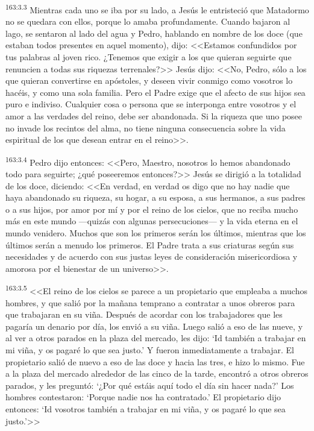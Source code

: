 \par 
\textsuperscript{163:3.3} Mientras cada uno se iba por su lado, a Jesús le entristeció que Matadormo no se quedara con ellos, porque lo amaba profundamente. Cuando bajaron al lago, se sentaron al lado del agua y Pedro, hablando en nombre de los doce (que estaban todos presentes en aquel momento), dijo: <<Estamos confundidos por tus palabras al joven rico. ¿Tenemos que exigir a los que quieran seguirte que renuncien a todas sus riquezas terrenales?>> Jesús dijo: <<No, Pedro, sólo a los que quieran convertirse en apóstoles, y deseen vivir conmigo como vosotros lo hacéis, y como una sola familia. Pero el Padre exige que el afecto de sus hijos sea puro e indiviso. Cualquier cosa o persona que se interponga entre vosotros y el amor a las verdades del reino, debe ser abandonada. Si la riqueza que uno posee no invade los recintos del alma, no tiene ninguna consecuencia sobre la vida espiritual de los que desean entrar en el reino>>.

\par 
\textsuperscript{163:3.4} Pedro dijo entonces: <<Pero, Maestro, nosotros lo hemos abandonado todo para seguirte; ¿qué poseeremos entonces?>> Jesús se dirigió a la totalidad de los doce, diciendo: <<En verdad, en verdad os digo que no hay nadie que haya abandonado su riqueza, su hogar, a su esposa, a sus hermanos, a sus padres o a sus hijos, por amor por mí y por el reino de los cielos, que no reciba mucho más en este mundo ---quizás con algunas persecuciones--- y la vida eterna en el mundo venidero. Muchos que son los primeros serán los últimos, mientras que los últimos serán a menudo los primeros. El Padre trata a sus criaturas según sus necesidades y de acuerdo con sus justas leyes de consideración misericordiosa y amorosa por el bienestar de un universo>>.

\par 
\textsuperscript{163:3.5} <<El reino de los cielos se parece a un propietario que empleaba a muchos hombres, y que salió por la mañana temprano a contratar a unos obreros para que trabajaran en su viña. Después de acordar con los trabajadores que les pagaría un denario por día, los envió a su viña. Luego salió a eso de las nueve, y al ver a otros parados en la plaza del mercado, les dijo: `Id también a trabajar en mi viña, y os pagaré lo que sea justo.' Y fueron inmediatamente a trabajar. El propietario salió de nuevo a eso de las doce y hacia las tres, e hizo lo mismo. Fue a la plaza del mercado alrededor de las cinco de la tarde, encontró a otros obreros parados, y les preguntó: `¿Por qué estáis aquí todo el día sin hacer nada?' Los hombres contestaron: `Porque nadie nos ha contratado.' El propietario dijo entonces: `Id vosotros también a trabajar en mi viña, y os pagaré lo que sea justo.'>>

